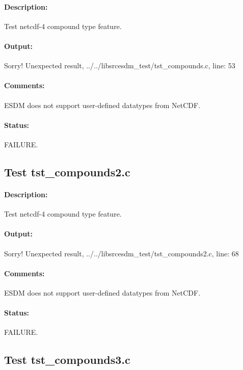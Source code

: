 \paragraph{Description:} Test netcdf-4 compound type feature.

\paragraph{Output:} Sorry! Unexpected result, ../../libsrcesdm\_test/tst\_compounds.c, line: 53

\paragraph{Comments:} ESDM does not support user-defined datatypes from NetCDF.

\paragraph{Status:} FAILURE.

\subsection{Test tst\_compounds2.c}

\paragraph{Description:} Test netcdf-4 compound type feature.

\paragraph{Output:} Sorry! Unexpected result, ../../libsrcesdm\_test/tst\_compounds2.c, line: 68

\paragraph{Comments:} ESDM does not support user-defined datatypes from NetCDF.

\paragraph{Status:} FAILURE.

\subsection{Test tst\_compounds3.c}

